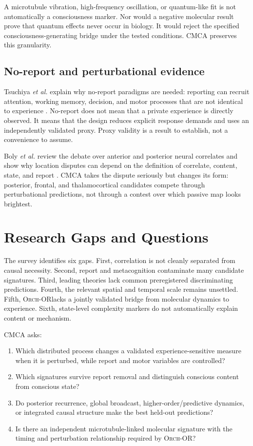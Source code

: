 \documentclass[conference]{IEEEtran}
\newcommand{\ORCH}{\textsc{Orch-OR}}
\begin{document}
A microtubule vibration, high-frequency oscillation, or quantum-like fit is not automatically a consciousness marker. Nor would a negative molecular result prove that quantum effects never occur in biology. It would reject the specified consciousness-generating bridge under the tested conditions. CMCA preserves this granularity.

\subsection{No-report and perturbational evidence}

Tsuchiya \textit{et al.} explain why no-report paradigms are needed: reporting can recruit attention, working memory, decision, and motor processes that are not identical to experience \cite{tsuchiya2015}. No-report does not mean that a private experience is directly observed. It means that the design reduces explicit response demands and uses an independently validated proxy. Proxy validity is a result to establish, not a convenience to assume.

Boly \textit{et al.} review the debate over anterior and posterior neural correlates and show why location disputes can depend on the definition of correlate, content, state, and report \cite{boly2017}. CMCA takes the dispute seriously but changes its form: posterior, frontal, and thalamocortical candidates compete through perturbational predictions, not through a contest over which passive map looks brightest.

\section{Research Gaps and Questions}

The survey identifies six gaps. First, correlation is not cleanly separated from causal necessity. Second, report and metacognition contaminate many candidate signatures. Third, leading theories lack common preregistered discriminating predictions. Fourth, the relevant spatial and temporal scale remains unsettled. Fifth, \ORCH lacks a jointly validated bridge from molecular dynamics to experience. Sixth, state-level complexity markers do not automatically explain content or mechanism.

CMCA asks:
\begin{enumerate}
\item Which distributed process changes a validated experience-sensitive measure when it is perturbed, while report and motor variables are controlled?
\item Which signatures survive report removal and distinguish conscious content from conscious state?
\item Do posterior recurrence, global broadcast, higher-order/predictive dynamics, or integrated causal structure make the best held-out predictions?
\item Is there an independent microtubule-linked molecular signature with the timing and perturbation relationship required by \ORCH?
\end{enumerate}
\end{document}
